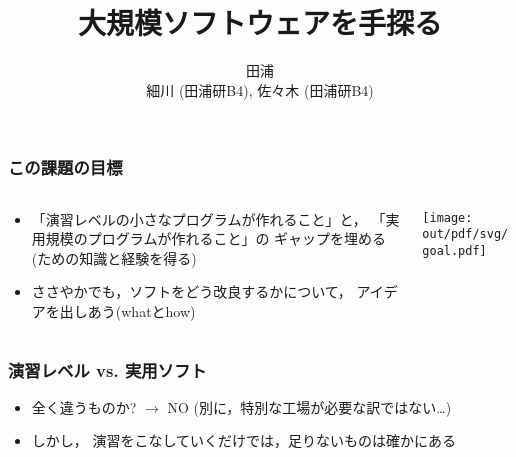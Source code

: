 \documentclass[12pt,dvipdfmx]{beamer}
\title{大規模ソフトウェアを手探る}
\institute{}
\author{田浦 \\ 細川 (田浦研B4), 佐々木 (田浦研B4) }
\date{}
\newcommand{\mura}[1]{{\color{purple}#1}}
\begin{document}
\maketitle

\iffalse
\begin{frame}
\frametitle{Contents}
\tableofcontents
\end{frame}
\fi

\begin{frame}
\frametitle{この課題の目標}
\begin{columns}
\begin{column}{0.4\textwidth}
  \begin{itemize}
  \item 「演習レベルの小さなプログラムが作れること」と，
    「実用規模のプログラムが作れること」の
    ギャップを埋める(ための知識と経験を得る)
  \item ささやかでも，ソフトをどう改良するかについて，
    アイデアを出しあう(whatとhow)
  \end{itemize}
\end{column}
\begin{column}{0.6\textwidth}
\begin{center}
\texttt{[image: out/pdf/svg/goal.pdf]}
\end{center}
\end{column}
\end{columns}
\end{frame}

\begin{frame}
\frametitle{演習レベル vs. 実用ソフト}
\begin{itemize}
\item 全く違うものか? $\rightarrow$ NO 
  (別に，特別な工場が必要な訳ではない\ldots)

\item しかし，
  \mura{演習をこなしていくだけでは，足りないものは確かにある}
\end{itemize}
\end{frame}
\end{document}
